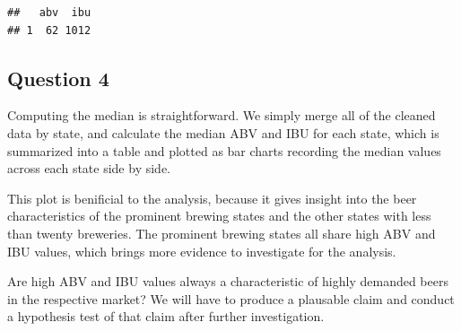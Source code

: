 \documentclass[]{article}
\newenvironment{Shaded}{\begin{snugshade}}{\end{snugshade}}
\newcommand{\KeywordTok}[1]{\textcolor[rgb]{0.13,0.29,0.53}{\textbf{#1}}}
\newcommand{\StringTok}[1]{\textcolor[rgb]{0.31,0.60,0.02}{#1}}
\newcommand{\CommentTok}[1]{\textcolor[rgb]{0.56,0.35,0.01}{\textit{#1}}}
\newcommand{\ControlFlowTok}[1]{\textcolor[rgb]{0.13,0.29,0.53}{\textbf{#1}}}
\newcommand{\OperatorTok}[1]{\textcolor[rgb]{0.81,0.36,0.00}{\textbf{#1}}}
\newcommand{\NormalTok}[1]{#1}
\begin{document}
\begin{Shaded}
\end{Shaded}

\begin{verbatim}
##   abv  ibu
## 1  62 1012
\end{verbatim}

\subsection{Question 4}\label{question-4}

Computing the median is straightforward. We simply merge all of the
cleaned data by state, and calculate the median ABV and IBU for each
state, which is summarized into a table and plotted as bar charts
recording the median values across each state side by side.

This plot is benificial to the analysis, because it gives insight into
the beer characteristics of the prominent brewing states and the other
states with less than twenty breweries. The prominent brewing states all
share high ABV and IBU values, which brings more evidence to investigate
for the analysis.

Are high ABV and IBU values always a characteristic of highly demanded
beers in the respective market? We will have to produce a plausable
claim and conduct a hypothesis test of that claim after further
investigation.
\end{document}
